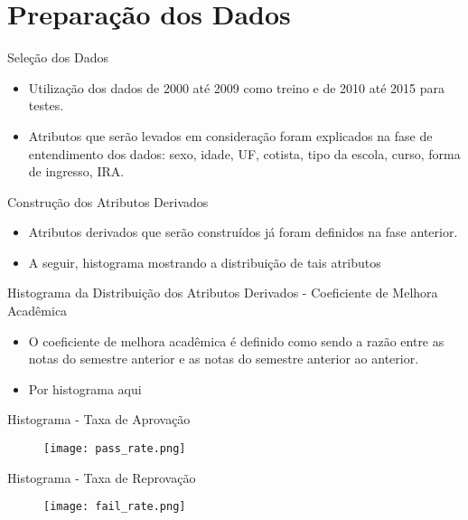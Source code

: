 
\section{Preparação dos Dados}
\begin{frame}{Seleção dos Dados}
\begin{itemize}[itemsep=3ex]
    \item Utilização dos dados de 2000 até 2009 como treino e de 2010 até 2015 para
        testes. 
    \item Atributos que serão levados em consideração foram explicados na fase de
        entendimento dos dados: sexo, idade, UF, cotista, tipo da escola,
        curso, forma de ingresso, IRA.
\end{itemize}
\end{frame}

\begin{frame}{Construção dos Atributos Derivados}
\begin{itemize}[itemsep=3ex]
    \item Atributos derivados que serão construídos já foram definidos na fase
        anterior.
    \item A seguir, histograma mostrando a distribuição de tais atributos
\end{itemize}
\end{frame}

\begin{frame}{Histograma da Distribuição dos Atributos Derivados - Coeficiente de
    Melhora Acadêmica}
\begin{itemize}[itemsep=3ex]
        \item O coeficiente de melhora acadêmica é definido como sendo a razão entre
            as notas do semestre anterior e as notas do semestre anterior ao
            anterior.
        \item Por histograma aqui
\end{itemize}
\end{frame}

\begin{frame}{Histograma - Taxa de Aprovação}
    \begin{figure}[!ht]
    \centering
    \texttt{[image: pass\_rate.png]}
    \end{figure}
\end{frame}

\begin{frame}{Histograma - Taxa de Reprovação}
    \begin{figure}[!ht]
    \centering
    \texttt{[image: fail\_rate.png]}
    \end{figure}
\end{frame}

